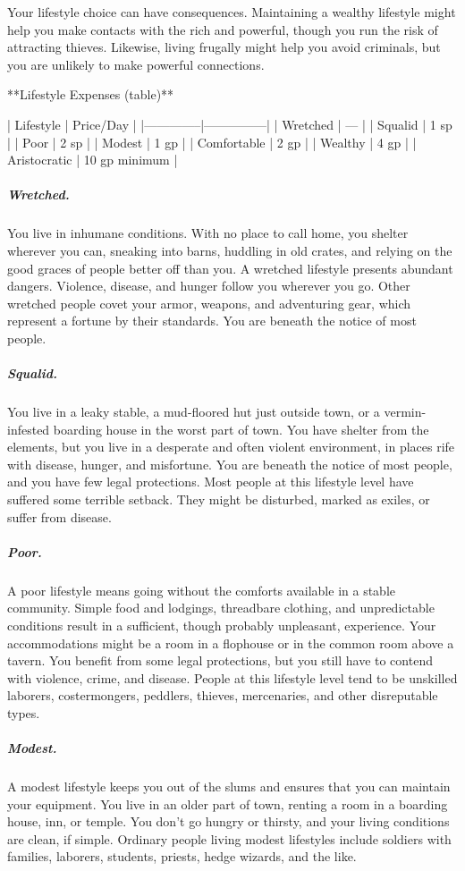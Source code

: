 Your lifestyle choice can have consequences. Maintaining a wealthy lifestyle might help you make contacts with the rich and powerful, though you run the risk of attracting thieves. Likewise, living frugally might help you avoid criminals, but you are unlikely to make powerful connections.

**Lifestyle Expenses (table)**

| Lifestyle    | Price/Day     |
|--------------|---------------|
| Wretched     | —             |
| Squalid      | 1 sp          |
| Poor         | 2 sp          |
| Modest       | 1 gp          |
| Comfortable  | 2 gp          |
| Wealthy      | 4 gp          |
| Aristocratic | 10 gp minimum |

\subparagraph*{Wretched.} You live in inhumane conditions. With no place to call home, you shelter wherever you can, sneaking into barns, huddling in old crates, and relying on the good graces of people better off than you. A wretched lifestyle presents abundant dangers. Violence, disease, and hunger follow you wherever you go. Other wretched people covet your armor, weapons, and adventuring gear, which represent a fortune by their standards. You are beneath the notice of most people.

\subparagraph*{Squalid.} You live in a leaky stable, a mud-floored hut just outside town, or a vermin-infested boarding house in the worst part of town. You have shelter from the elements, but you live in a desperate and often violent environment, in places rife with disease, hunger, and misfortune. You are beneath the notice of most people, and you have few legal protections. Most people at this lifestyle level have suffered some terrible setback. They might be disturbed, marked as exiles, or suffer from disease.

\subparagraph*{Poor.} A poor lifestyle means going without the comforts available in a stable community. Simple food and lodgings, threadbare clothing, and unpredictable conditions result in a sufficient, though probably unpleasant, experience. Your accommodations might be a room in a flophouse or in the common room above a tavern. You benefit from some legal protections, but you still have to contend with violence, crime, and disease. People at this lifestyle level tend to be unskilled laborers, costermongers, peddlers, thieves, mercenaries, and other disreputable types.

\subparagraph*{Modest.} A modest lifestyle keeps you out of the slums and ensures that you can maintain your equipment. You live in an older part of town, renting a room in a boarding house, inn, or temple. You don't go hungry or thirsty, and your living conditions are clean, if simple. Ordinary people living modest lifestyles include soldiers with families, laborers, students, priests, hedge wizards, and the like.

